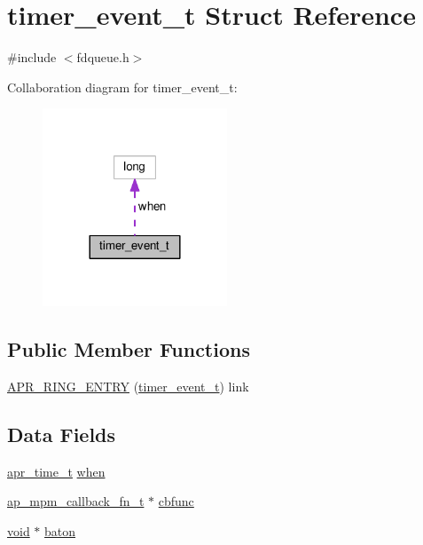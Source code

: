 \hypertarget{structtimer__event__t}{}\section{timer\+\_\+event\+\_\+t Struct Reference}
\label{structtimer__event__t}


{\ttfamily \#include $<$fdqueue.\+h$>$}



Collaboration diagram for timer\+\_\+event\+\_\+t\+:
\nopagebreak
\begin{figure}[H]
\begin{center}
\leavevmode
\includegraphics[width=156pt]{structtimer__event__t__coll__graph}
\end{center}
\end{figure}
\subsection*{Public Member Functions}
\begin{DoxyCompactItemize}
\item 
\hyperlink{structtimer__event__t_a72ac06c3f5f488bdc0345ab01e0c2120}{A\+P\+R\+\_\+\+R\+I\+N\+G\+\_\+\+E\+N\+T\+RY} (\hyperlink{structtimer__event__t}{timer\+\_\+event\+\_\+t}) link
\end{DoxyCompactItemize}
\subsection*{Data Fields}
\begin{DoxyCompactItemize}
\item 
\hyperlink{group__apr__time_gadb4bde16055748190eae190c55aa02bb}{apr\+\_\+time\+\_\+t} \hyperlink{structtimer__event__t_a37ec17770ee31fcde7dfd8e81e214903}{when}
\item 
\hyperlink{group__APACHE__CORE__MPM_ga0ca31a834a87abfb20d959041aa57de0}{ap\+\_\+mpm\+\_\+callback\+\_\+fn\+\_\+t} $\ast$ \hyperlink{structtimer__event__t_a1177171bd789a9c14dccd34d93b0d9e9}{cbfunc}
\item 
\hyperlink{group__MOD__ISAPI_gacd6cdbf73df3d9eed42fa493d9b621a6}{void} $\ast$ \hyperlink{structtimer__event__t_a7fc09baa2b611afc771beed2ac9ca648}{baton}
\end{DoxyCompactItemize}


